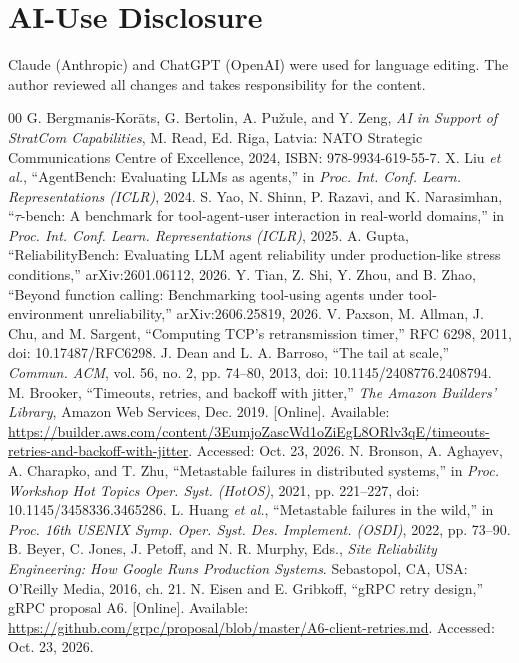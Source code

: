 \documentclass[conference,a4paper]{IEEEtran}
\begin{document}
\section*{AI-Use Disclosure}
Claude (Anthropic) and ChatGPT (OpenAI) were used for language editing. The author reviewed all changes and takes responsibility for the content.

\balance
\begin{thebibliography}{00}
 G. Bergmanis-Kor\=ats, G. Bertolin, A. Pu\v{z}ule, and Y. Zeng, \emph{AI in Support of StratCom Capabilities}, M. Read, Ed. Riga, Latvia: NATO Strategic Communications Centre of Excellence, 2024, ISBN: \mbox{978-9934-619-55-7}.
 X. Liu \emph{et al.}, ``AgentBench: Evaluating LLMs as agents,'' in \emph{Proc. Int. Conf. Learn. Representations (ICLR)}, 2024.
 S. Yao, N. Shinn, P. Razavi, and K. Narasimhan, ``$\tau$-bench: A benchmark for tool-agent-user interaction in real-world domains,'' in \emph{Proc. Int. Conf. Learn. Representations (ICLR)}, 2025.
 A. Gupta, ``ReliabilityBench: Evaluating LLM agent reliability under production-like stress conditions,'' arXiv:2601.06112, 2026.
 Y. Tian, Z. Shi, Y. Zhou, and B. Zhao, ``Beyond function calling: Benchmarking tool-using agents under tool-environment unreliability,'' arXiv:2606.25819, 2026.
 V. Paxson, M. Allman, J. Chu, and M. Sargent, ``Computing TCP's retransmission timer,'' RFC 6298, 2011, doi: 10.17487/RFC6298.
 J. Dean and L. A. Barroso, ``The tail at scale,'' \emph{Commun. ACM}, vol. 56, no. 2, pp. 74--80, 2013, doi: 10.1145/2408776.2408794.
 M. Brooker, ``Timeouts, retries, and backoff with jitter,'' \emph{The Amazon Builders' Library}, Amazon Web Services, Dec. 2019. [Online]. Available: \url{https://builder.aws.com/content/3EumjoZascWd1oZiEgL8ORlv3qE/timeouts-retries-and-backoff-with-jitter}. Accessed: Oct. 23, 2026.
 N. Bronson, A. Aghayev, A. Charapko, and T. Zhu, ``Metastable failures in distributed systems,'' in \emph{Proc. Workshop Hot Topics Oper. Syst. (HotOS)}, 2021, pp. 221--227, doi: 10.1145/3458336.3465286.
 L. Huang \emph{et al.}, ``Metastable failures in the wild,'' in \emph{Proc. 16th USENIX Symp. Oper. Syst. Des. Implement. (OSDI)}, 2022, pp. 73--90.
 B. Beyer, C. Jones, J. Petoff, and N. R. Murphy, Eds., \emph{Site Reliability Engineering: How Google Runs Production Systems}. Sebastopol, CA, USA: O'Reilly Media, 2016, ch. 21.
 N. Eisen and E. Gribkoff, ``gRPC retry design,'' gRPC proposal A6. [Online]. Available: \url{https://github.com/grpc/proposal/blob/master/A6-client-retries.md}. Accessed: Oct. 23, 2026.

\end{thebibliography}
\end{document}
